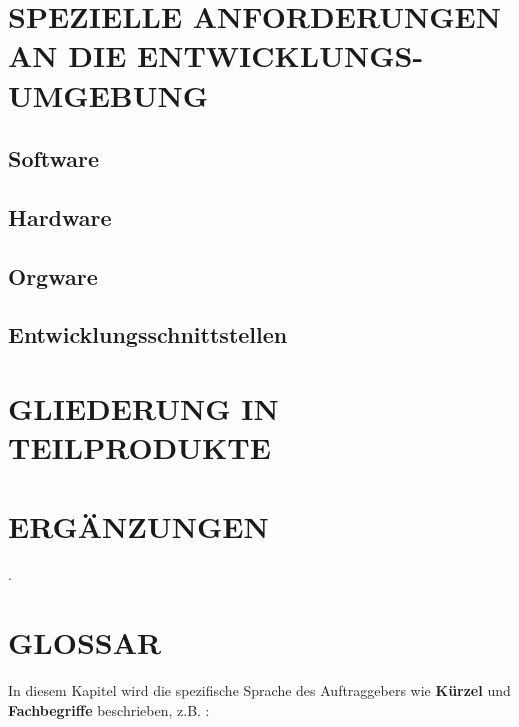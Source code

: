 	
	\section{\Large SPEZIELLE ANFORDERUNGEN AN DIE ENTWICKLUNGS-UMGEBUNG}
	
	\subsection{Software}
	\subsection{Hardware}
	\subsection{Orgware}
	\subsection{Entwicklungsschnittstellen}
	
	
	\section{\Large GLIEDERUNG IN TEILPRODUKTE}
	
	
	\section{\Large ERGÄNZUNGEN}
	.
	
\newpage
	\section{\Large GLOSSAR}
	In diesem Kapitel wird die spezifische Sprache des Auftraggebers wie \textbf{ Kürzel } und \textbf{ Fachbegriffe } beschrieben, z.B. :
	
		
		